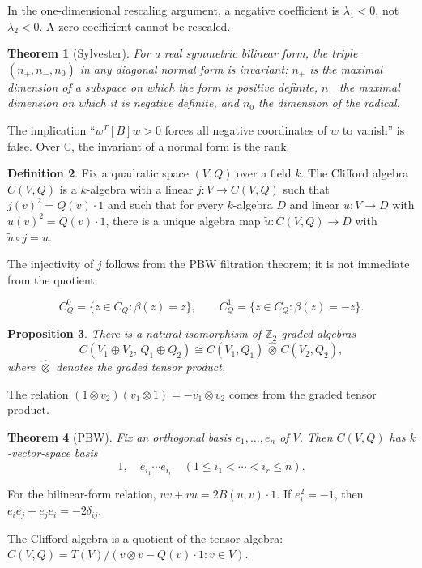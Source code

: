 \documentclass[12pt]{article}
\theoremstyle{plain}
\newtheorem{thm}{Theorem}[subsection] %
\newtheorem{proposition}[thm]{Proposition}
\theoremstyle{definition}
\newtheorem{defn}[thm]{Definition} %
\begin{document}
In the one-dimensional rescaling argument, a negative coefficient is $\lambda_1<0$, not $\lambda_2<0$. A zero coefficient cannot be rescaled.

\begin{thm}[Sylvester]
For a real symmetric bilinear form, the triple $(n_+,n_-,n_0)$ in any diagonal normal form is invariant: $n_+$ is the maximal dimension of a subspace on which the form is positive definite, $n_-$ the maximal dimension on which it is negative definite, and $n_0$ the dimension of the radical.
\end{thm}

The implication ``$w^T[B]w>0$ forces all negative coordinates of $w$ to vanish'' is false. Over $\mathbb{C}$, the invariant of a normal form is the rank.

\begin{defn}
Fix a quadratic space $(V,Q)$ over a field $k$. The Clifford algebra $C(V,Q)$ is a $k$-algebra with a linear $j:V\to C(V,Q)$ such that $j(v)^2=Q(v)\cdot 1$ and such that for every $k$-algebra $D$ and linear $u:V\to D$ with $u(v)^2=Q(v)\cdot 1$, there is a unique algebra map $\tilde{u}:C(V,Q)\to D$ with $\tilde{u}\circ j=u$.
\end{defn}

The injectivity of $j$ follows from the PBW filtration theorem; it is not immediate from the quotient.

\[
C_Q^0=\{z\in C_Q:\beta(z)=z\},\qquad C_Q^1=\{z\in C_Q:\beta(z)=-z\}.
\]

\begin{proposition}
There is a natural isomorphism of $\mathbb{Z}_2$-graded algebras
\[
C(V_1\oplus V_2,\,Q_1\oplus Q_2)\cong C(V_1,Q_1)\,\widehat{\otimes}\,C(V_2,Q_2),
\]
where $\widehat{\otimes}$ denotes the graded tensor product.
\end{proposition}

The relation $(1\otimes v_2)(v_1\otimes 1)=-v_1\otimes v_2$ comes from the graded tensor product.

\begin{thm}[PBW]
Fix an orthogonal basis $e_1,\ldots,e_n$ of $V$. Then $C(V,Q)$ has $k$-vector-space basis
\[
1,\quad e_{i_1}\cdots e_{i_r}\quad (1\le i_1<\cdots<i_r\le n).
\]
\end{thm}

For the bilinear-form relation, $uv+vu=2B(u,v)\cdot 1$. If $e_i^2=-1$, then $e_ie_j+e_je_i=-2\delta_{ij}$.

The Clifford algebra is a quotient of the tensor algebra: $C(V,Q)=T(V)/(v\otimes v-Q(v)\cdot 1:v\in V)$.
\end{document}
